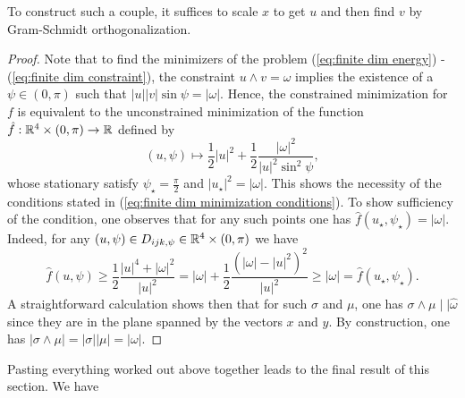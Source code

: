 \begin{remark}
To construct such a couple, it suffices to scale $x$ to get $u$ and then find $v$ by Gram-Schmidt orthogonalization.
\end{remark}

\begin{proof}
Note that to find the minimizers of the problem (\ref{eq:finite dim energy}) - (\ref{eq:finite dim constraint}), the constraint $u \wedge v = \omega$ implies the existence of a $\psi \in (0, \pi)$ such that $|u||v| \sin \psi= |\omega|$. Hence, the constrained minimization for $f$ is equivalent to the unconstrained minimization of the function $\hat{f}: \mathbb{R}^4 \times (0, \pi) \to \mathbb{R}$ defined by
\begin{equation}
(u, \psi) \mapsto \frac{1}{2} |u|^2 + \frac{1}{2} \frac{|\omega|^2}{|u|^2 \sin^2\psi},
\end{equation}
whose stationary satisfy $\psi_{\star} = \frac{\pi}{2}$ and $|u_{\star}|^2 = |\omega|$. This shows the necessity of the conditions stated in (\ref{eq:finite dim minimization conditions}). To show sufficiency of the condition, one observes that for any such points one has $\hat{f}(u_{\star}, \psi_{\star}) = |\omega|$. Indeed, for any $(u, \psi) \in D_{ijk, \psi} \in \mathbb{R}^4 \times (0, \pi)$ we have
\begin{equation}
\hat{f}(u, \psi) \geq \frac{1}{2} \frac{|u|^4 + |\omega|^2}{|u|^2} = |\omega| + \frac{1}{2}\frac{(|\omega| - |u|^2)^2}{|u|^2} \geq |\omega| = \hat{f}(u_{\star}, \psi_{\star}).
\end{equation}
A straightforward calculation shows then that for such $\sigma$ and $\mu$, one has $\sigma \wedge \mu \mid \mid \hat{\omega}$ since they are in the plane spanned by the vectors $x$ and $y$. By construction, one has $|\sigma \wedge \mu| = |\sigma| |\mu| = |\omega|$.
\end{proof}

Pasting everything worked out above together leads to the final result of this section. We have


